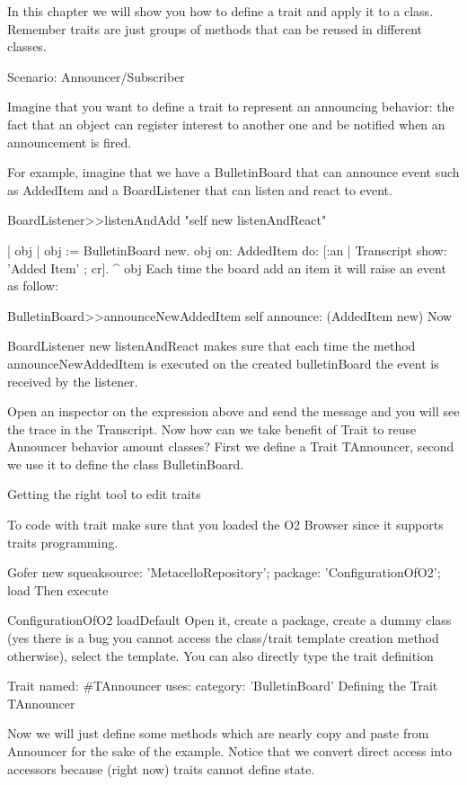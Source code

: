 \chapterauthor{\authoralex{} \\ \authorsteph{}}

In this chapter we will show you how to define a trait and apply it to a class. Remember traits are just groups of methods that can be reused in different classes.

Scenario: Announcer/Subscriber

Imagine that you want to define a trait to represent an announcing behavior: the fact that an object can register interest to another one and be notified when an announcement is fired.

For example, imagine that we have a BulletinBoard that can announce event such as AddedItem and a BoardListener that can listen and react to event.

BoardListener>>listenAndAdd
	"self new listenAndReact"
	
	| obj |
	obj := BulletinBoard new.
	obj on: AddedItem do: [:an | Transcript show: 'Added Item' ; cr].
	^ obj
Each time the board add an item it will raise an event as follow:

BulletinBoard>>announceNewAddedItem
	self announce: (AddedItem new)
Now

BoardListener new listenAndReact
makes sure that each time the method announceNewAddedItem is executed on the created bulletinBoard the event is received by the listener.

Open an inspector on the expression above and send the message and you will see the trace in the Transcript. Now how can we take benefit of Trait to reuse Announcer behavior amount classes? First we define a Trait TAnnouncer, second we use it to define the class BulletinBoard.

Getting the right tool to edit traits

To code with trait make sure that you loaded the O2 Browser since it supports traits programming.

	Gofer new
		squeaksource: 'MetacelloRepository';
		package: 'ConfigurationOfO2';
		load
Then execute

	ConfigurationOfO2 loadDefault
Open it, create a package, create a dummy class (yes there is a bug you cannot access the class/trait template creation method otherwise), select the template. You can also directly type the trait definition

Trait named: #TAnnouncer
	uses: {}
	category: 'BulletinBoard'
Defining the Trait TAnnouncer

Now we will just define some methods which are nearly copy and paste from Announcer for the sake of the example. Notice that we convert direct access into accessors because (right now) traits cannot define state.

